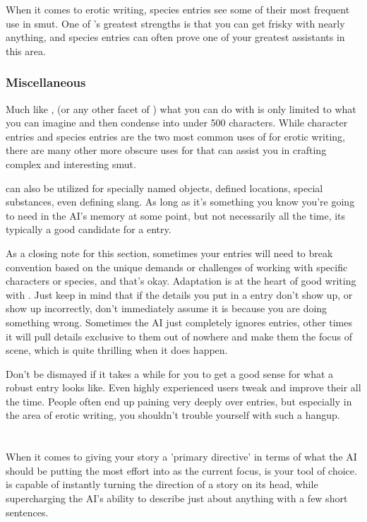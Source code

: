 ﻿\documentclass[Coomer-main.tex]{subfiles}
\begin{document}
When it comes to erotic writing, species entries see some of their most frequent use in smut.
One of \aid's greatest strengths is that you can get frisky with nearly anything, and species entries can often prove one of your greatest assistants in this area.

\subsection{Miscellaneous}

Much like \an, (or any other facet of \aid) what you can do with \wi is only limited to what you can imagine and then condense into under 500 characters.
While character entries and species entries are the two most common uses of \wi for erotic writing, there are many other more obscure uses for \wi that can assist you in crafting complex and interesting smut.

\wi can also be utilized for specially named objects, defined locations, special substances, even defining slang.
As long as it's something you know you're going to need in the AI's memory at some point, but not necessarily all the time, its typically a good candidate for a \wi entry.

As a closing note for this section, sometimes your \wi entries will need to break convention based on the unique demands or challenges of working with specific characters or species, and that's okay.
Adaptation is at the heart of good writing with \aid.
Just keep in mind that if the details you put in a \wi entry don't show up, or show up incorrectly, don't immediately assume it is because you are doing something wrong.
Sometimes the AI just completely ignores entries, other times it will pull details exclusive to them out of nowhere and make them the focus of scene, which is quite thrilling when it does happen.

Don't be dismayed if it takes a while for you to get a good sense for what a robust \wi entry looks like.
Even highly experienced users tweak and improve their \wi all the time.
People often end up paining very deeply over \wi entries, but especially in the area of erotic writing, you shouldn't trouble yourself with such a hangup.

\chapter{\ans}
\label{ch:ans}

When it comes to giving your story a 'primary directive' in terms of what the AI should be putting the most effort into as the current focus, \an is your tool of choice. \an is capable of instantly turning the direction of a story on its head, while supercharging the AI's ability to describe just about anything with a few short sentences.
\end{document}
